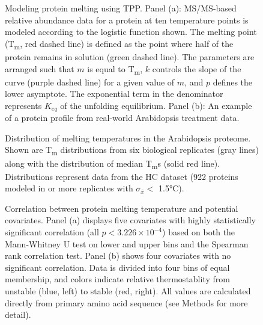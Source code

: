 \documentclass[11pt,letter]{article}\usepackage[]{graphicx}\usepackage[]{color}
\newcommand{\Tm}{T\textsubscript{m}}
\newcommand{\sem}{\sigma_{\bar{x}}}
\newcommand{\celsius}[1]{#1°C}
\begin{document}

\begin{figure}\centering

\caption{Modeling protein melting using TPP. Panel (a): MS/MS-based relative
abundance data for a protein at ten temperature points is modeled according to
the logistic function shown. The melting point (\Tm, red dashed line) is
defined as the point where half of the protein remains in solution (green
dashed line). The parameters are arranged such that $m$ is equal to \Tm{}, $k$
controls the slope of the curve (purple dashed line) for a given value of $m$,
and $p$ defines the lower asymptote. The exponential term in the denominator
represents $K_{eq}$ of the unfolding equilibrium. Panel (b): An example of a
protein profile from real-world Arabidopsis treatment data.}

\label{fig:model}
\end{figure}


\begin{figure}\centering

\caption{Distribution of melting temperatures in the Arabidopsis proteome.
Shown are \Tm{} distributions from six biological replicates (gray lines)
along with the distribution of median \Tm{}s (solid red line). Distributions
represent data from the HC dataset (922 proteins
modeled in \protect {} or more replicates with
$\sem <$ \celsius{1.5}).}

\label{fig:tm_dists}
\end{figure}


\begin{figure}\centering

\caption{Correlation between protein melting temperature and potential
covariates. Panel (a) displays five covariates with highly statistically
significant correlation (all $p < \ensuremath{3.226\times 10^{-4}}$) based on both the
Mann-Whitney U test on lower and upper bins and the Spearman rank correlation
test. Panel (b) shows four covariates with no significant correlation. Data is
divided into four bins of equal membership, and colors indicate relative
thermostablity from unstable (blue, left) to stable (red, right). All values
are calculated directly from primary amino acid sequence (see Methods for more
detail).}

\label{fig:feats}
\end{figure}
\end{document}
